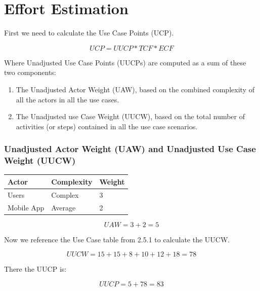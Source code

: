 \documentclass[letterpaper,english, 12pt]{scrreprt}
\begin{document}
\section{Effort Estimation}

First we need to calculate the Use Case Points (UCP).

\begin{equation}
UCP = UUCP* TCF *ECF
\end{equation}

Where Unadjusted Use Case Points (UUCPs) are computed as a sum of these two components:

\begin{enumerate}
\item The Unadjusted Actor Weight (UAW), based on the combined complexity of all the actors in all the use cases.
\item The Unadjusted use Case Weight (UUCW), based on the total number of activities (or steps) contained in all the use case scenarios.
\end{enumerate}


\subsubsection{Unadjusted Actor Weight (UAW) and Unadjusted Use Case Weight (UUCW)}
\begin{center}
        \begin{tabular}{|C{3cm}|C{3cm}|C{3cm}|}
                \hline
                        Actor & Complexity & Weight \\
                \hline
                       Users & Complex & 3 \\
                \hline
                       Mobile App & Average & 2 \\
                \hline
        \end{tabular}
\end{center}

\begin{equation}
UAW = 3 + 2 = 5
\end{equation}

Now we reference the Use Case table from 2.5.1 to calculate the UUCW.

\begin{equation}
UUCW = 15 + 15 + 8 + 10 + 12 + 18 = 78
\end{equation}

There the UUCP is:

\begin{equation}
UUCP = 5 + 78 = 83
\end{equation}
\end{document}
